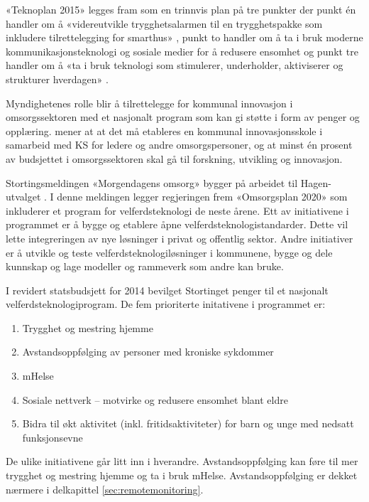 «Teknoplan 2015» legges fram som en trinnvis plan på tre punkter der punkt én handler om å «videreutvikle trygghetsalarmen
til en trygghetspakke som inkludere tilrettelegging for smarthus» , punkt to handler om å ta i bruk moderne
kommunikasjonsteknologi og sosiale medier for å redusere ensomhet og punkt tre handler om å «ta i bruk teknologi
som stimulerer, underholder, aktiviserer og strukturer hverdagen» \citep[s. 17]{regjeringen_hagen}.

Myndighetenes rolle blir å tilrettelegge for kommunal innovasjon i omsorgssektoren med et nasjonalt program
som kan gi støtte i form av penger og opplæring. \citet[s. 19]{regjeringen_hagen} mener at at det må
etableres en kommunal innovasjonsskole i samarbeid med KS for ledere og andre omsorgspersoner, og at minst én prosent
av budsjettet i omsorgssektoren skal gå til forskning, utvikling og innovasjon.

Stortingsmeldingen «Morgendagens omsorg» bygger på arbeidet til Hagen-utvalget \citep{morgendagens_omsorg}.
I denne meldingen legger regjeringen frem «Omsorgsplan 2020» som inkluderer et program for velferdsteknologi de neste årene.
Ett av initiativene i programmet er å bygge og etablere åpne velferdsteknologistandarder. Dette vil lette integreringen av nye
løsninger i privat og offentlig sektor. Andre initiativer er å utvikle og teste velferdsteknologiløsninger i kommunene,
bygge og dele kunnskap og lage modeller og rammeverk som andre kan bruke.

I revidert statsbudsjett for 2014 bevilget Stortinget penger til et nasjonalt velferdsteknologiprogram. De fem prioriterte
initativene i programmet er:

\begin{enumerate}
    \item Trygghet og mestring hjemme
    \item Avstandsoppfølging av personer med kroniske sykdommer
    \item mHelse
    \item Sosiale nettverk -- motvirke og redusere ensomhet blant eldre
    \item Bidra til økt aktivitet (inkl. fritidsaktiviteter) for barn og unge med nedsatt funksjonsevne
\end{enumerate}

De ulike initiativene går litt inn i hverandre. Avstandsoppfølging kan føre til mer trygghet og mestring hjemme
og ta i bruk mHelse. Avstandsoppfølging er dekket nærmere i delkapittel \ref{sec:remotemonitoring}.

